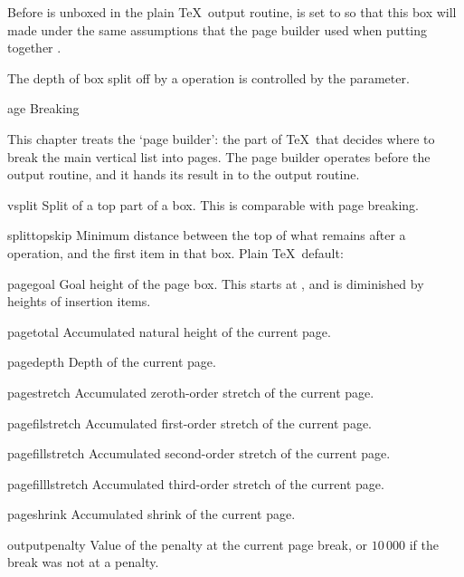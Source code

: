 Before  is unboxed in the plain \TeX\ output routine,
 is set to 
so that this box will made under the same assumptions
that the page builder used when putting together .

The depth of box split off by a  operation
is controlled by the  parameter.

\subject[page:break]  Page Breaking

This chapter treats the `page builder': the part of \TeX\
that decides where to break the main vertical list into pages.
The page builder operates before the output routine,
and it hands its result in  to the output routine.

\invent
\item vsplit
      Split of a top part of a box. This is comparable
      with page breaking.

\item splittopskip 
      Minimum distance between the top of what remains after a
       operation, and the first item in that box.
      Plain \TeX\ default:~\n{10pt}

\item pagegoal 
      Goal height of the page box. This starts at ,
      and is diminished by heights of insertion items.

\item pagetotal 
      Accumulated natural height of the current page.

\item pagedepth 
      Depth of the current page.

\item pagestretch 
      Accumulated zeroth-order stretch of the current page.

\item pagefilstretch 
      Accumulated first-order stretch of the current page.

\item pagefillstretch 
      Accumulated second-order stretch of the current page.

\item pagefilllstretch 
      Accumulated third-order stretch of the current page.

\item pageshrink 
      Accumulated shrink of the current page.

\item outputpenalty   
      Value of the penalty at the current page break,
      or $10\,000$ if the break was not at a penalty.

